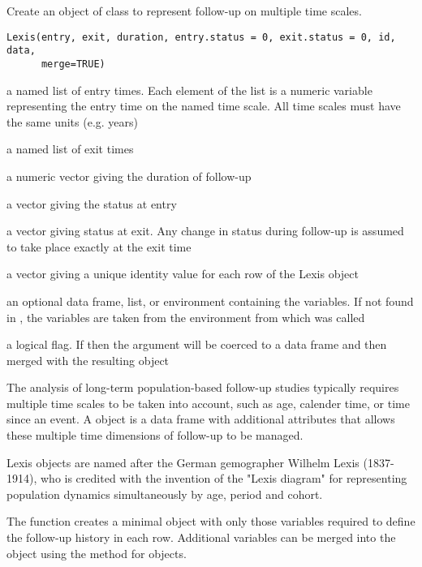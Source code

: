 \begin{Description}\relax
Create an object of class  to represent follow-up on
multiple time scales.
\end{Description}
\begin{Usage}
\begin{verbatim}
Lexis(entry, exit, duration, entry.status = 0, exit.status = 0, id, data,
      merge=TRUE)
\end{verbatim}
\end{Usage}
\begin{Arguments}
\begin{ldescription}
\item[\code{entry}] a named list of entry times. Each element of the list is
a numeric variable representing the entry time on the named time
scale. All time scales must have the same units (e.g. years)
\item[\code{exit}] a named list of exit times
\item[\code{duration}] a numeric vector giving the duration of follow-up
\item[\code{entry.status}] a vector giving the status at entry
\item[\code{exit.status}] a vector giving status at exit. Any change in
status during follow-up is assumed to take place exactly at the exit time
\item[\code{id}] a vector giving a unique identity value for each row of the
Lexis object
\item[\code{data}] an optional data frame, list, or environment containing
the variables. If  not found in , the variables are
taken from the environment from which  was called
\item[\code{merge}] a logical flag. If  then the  
argument will be coerced to a data frame and then merged with
the resulting  object
\end{ldescription}
\end{Arguments}
\begin{Details}\relax
The analysis of long-term population-based follow-up studies typically
requires multiple time scales to be taken into account, such as
age, calender time, or time since an event. A  object is
a data frame with additional attributes that allows these multiple time
dimensions of follow-up to be managed.

Lexis objects are named after the German gemographer Wilhelm
Lexis (1837-1914), who is credited with the invention of the
"Lexis diagram" for representing population dynamics simultaneously
by age, period and cohort.

The  function creates a minimal  object with
only those variables required to define the follow-up history in each
row. Additional variables can be merged into the  object
using the  method for  objects.
\end{Details}
